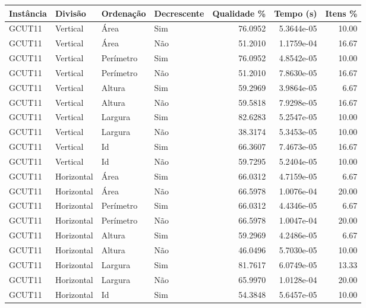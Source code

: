 \begin{tabular}{llllrrr}
\hline
Instância & Divisão     & Ordenação & Decrescente & Qualidade \% & Tempo (s)  & Itens \% \\
\hline
GCUT11    & Vertical    & Área      & Sim         & 76.0952      & 5.3644e-05 & 10.00    \\
GCUT11    & Vertical    & Área      & Não         & 51.2010      & 1.1759e-04 & 16.67    \\
GCUT11    & Vertical    & Perímetro & Sim         & 76.0952      & 4.8542e-05 & 10.00    \\
GCUT11    & Vertical    & Perímetro & Não         & 51.2010      & 7.8630e-05 & 16.67    \\
GCUT11    & Vertical    & Altura    & Sim         & 59.2969      & 3.9864e-05 & 6.67     \\
GCUT11    & Vertical    & Altura    & Não         & 59.5818      & 7.9298e-05 & 16.67    \\
GCUT11    & Vertical    & Largura   & Sim         & 82.6283      & 5.2547e-05 & 10.00    \\
GCUT11    & Vertical    & Largura   & Não         & 38.3174      & 5.3453e-05 & 10.00    \\
GCUT11    & Vertical    & Id        & Sim         & 66.3607      & 7.4673e-05 & 16.67    \\
GCUT11    & Vertical    & Id        & Não         & 59.7295      & 5.2404e-05 & 10.00    \\
GCUT11    & Horizontal  & Área      & Sim         & 66.0312      & 4.7159e-05 & 6.67     \\
GCUT11    & Horizontal  & Área      & Não         & 66.5978      & 1.0076e-04 & 20.00    \\
GCUT11    & Horizontal  & Perímetro & Sim         & 66.0312      & 4.4346e-05 & 6.67     \\
GCUT11    & Horizontal  & Perímetro & Não         & 66.5978      & 1.0047e-04 & 20.00    \\
GCUT11    & Horizontal  & Altura    & Sim         & 59.2969      & 4.2486e-05 & 6.67     \\
GCUT11    & Horizontal  & Altura    & Não         & 46.0496      & 5.7030e-05 & 10.00    \\
GCUT11    & Horizontal  & Largura   & Sim         & 81.7617      & 6.0749e-05 & 13.33    \\
GCUT11    & Horizontal  & Largura   & Não         & 65.9970      & 1.0128e-04 & 20.00    \\
GCUT11    & Horizontal  & Id        & Sim         & 54.3848      & 5.6457e-05 & 10.00    \\

\end{tabular}
